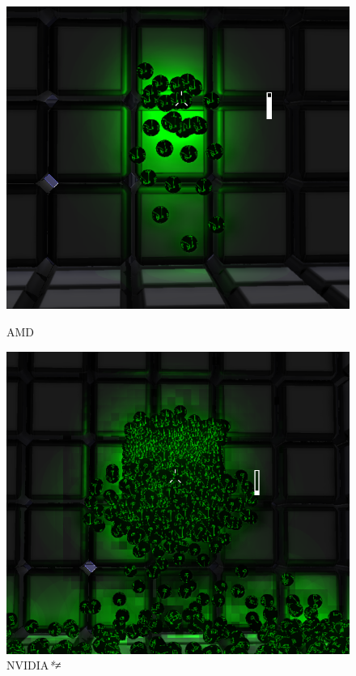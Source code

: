 \begin{frame}
\begin{figure}[ht]
  \begin{minipage}[b]{0.3\linewidth}
    \centering
    \includegraphics[width=1.0\textwidth]{img/tbds.png}
    \caption{AMD}
  \end{minipage}
  \hspace{0.25cm}
  \begin{minipage}[b]{0.3\linewidth}
    \centering
    \includegraphics[width=1.0\textwidth]{img/tbds_error.png}
    \caption{NVIDIA\textit{*≠}}
  \end{minipage}
  \label{fig:tilingerror}
\end{figure}

\end{frame}

